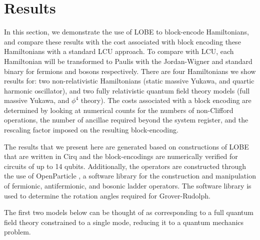 \section{Results}
\label{sec:results}

In this section, we demonstrate the use of LOBE to block-encode Hamiltonians, and compare these results with the cost associated with block encoding these Hamiltonians with a standard LCU approach.
To compare with LCU, each Hamiltonian will be transformed to Paulis with the Jordan-Wigner \cite{jordan-wigner} and standard binary \cite{standard-binary} for fermions and bosons respectively. 
There are four Hamiltonians we show results for: two non-relativistic Hamiltonians (static massive Yukawa, and quartic harmonic oscillator), and two fully relativistic quantum field theory models (full massive Yukawa, and $\phi^4$ theory).
The costs associated with a block encoding are determined by looking at numerical counts for the numbers of non-Clifford operations, the number of ancillae required beyond the system register, and the rescaling factor imposed on the resulting block-encoding.

The results that we present here are generated based on constructions of LOBE that are written in Cirq \cite{cirq} and the block-encodings are numerically verified for circuits of up to 14 qubits.
Additionally, the operators are constructed through the use of OpenParticle \cite{openparticle}, a software library for the construction and manipulation of fermionic, antifermionic, and bosonic ladder operators.
The software library \cite{grover-rudolph-github} is used to determine the rotation angles required for Grover-Rudolph.

The first two models below can be thought of as corresponding to a full quantum field theory constrained to a single mode, reducing it to a quantum mechanics problem.



